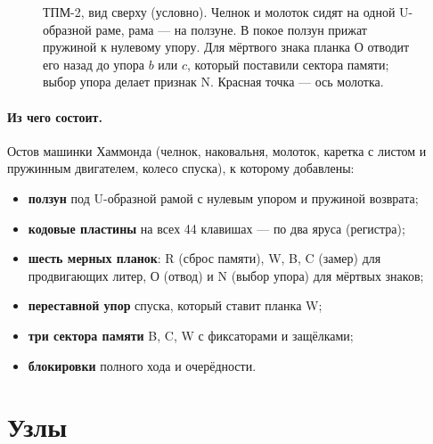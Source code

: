 \begin{figure}[h]
\caption{ТПМ-2, вид сверху (условно). Челнок и молоток сидят на одной U-образной раме, рама — на ползуне. В покое ползун прижат пружиной к нулевому упору. Для мёртвого знака планка О отводит его назад до упора $b$ или $c$, который поставили сектора памяти; выбор упора делает признак N. Красная точка — ось молотка.}
\label{fig:top}
\end{figure}

\paragraph{Из чего состоит.} Остов машинки Хаммонда (челнок, наковальня, молоток, каретка с листом и пружинным двигателем, колесо спуска), к которому добавлены:
\begin{itemize}
  \item \textbf{ползун} под U-образной рамой с нулевым упором и пружиной возврата;
  \item \textbf{кодовые пластины} на всех 44 клавишах — по два яруса (регистра);
  \item \textbf{шесть мерных планок}: R (сброс памяти), W, B, C (замер) для продвигающих литер, О (отвод) и N (выбор упора) для мёртвых знаков;
  \item \textbf{переставной упор} спуска, который ставит планка W;
  \item \textbf{три сектора памяти} B, C, W с фиксаторами и защёлками;
  \item \textbf{блокировки} полного хода и очерёдности.
\end{itemize}

\section{Узлы}

